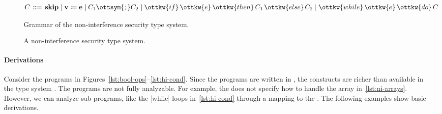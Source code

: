 \begin{figure}[t]
\centering\begin{align*}
C \, ::={ }& \, \mathbf{skip} \mid
\mathbf{v}\coloneqq{}\mathbf{e} \mid
\nonterm C_{{\mathrm{1}}}  \ottsym{;}  \nonterm C_{{\mathrm{2}}} \mid
\ottkw{if} \, \ottkw{e} \, \ottkw{then} \, \nonterm C_{{\mathrm{1}}}
\, \ottkw{else} \, \nonterm C_{{\mathrm{2}}} \mid
\ottkw{while} \, \ottkw{e} \, \ottkw{do} \, \nonterm C
\end{align*}
\caption[Grammar of the non-interference security type system]
{Grammar of the non-interference security type system.}
\label{fig:ni-syntax}
\end{figure}
\begin{figure}[t]
\centering{}
\centering{}
\caption[Non-interference security type system]
{A non-interference security type system.}\label{fig:ni-types}
\end{figure}

\paragraph*{Derivations}
Consider the programs in Figures~\ref{lst:bool-ops}--\ref{lst:hi-cond}. Since
the programs are written in , the constructs are richer than available
in the type system . The programs are not fully analyzable. For
example, the  does not specify how to handle the array
in~\autoref{lst:ni-arrays}. However, we can analyze sub-programs, like the
\pr|while| loops in~\autoref{lst:hi-cond} through a mapping to the
. The following examples show basic 
derivations.

